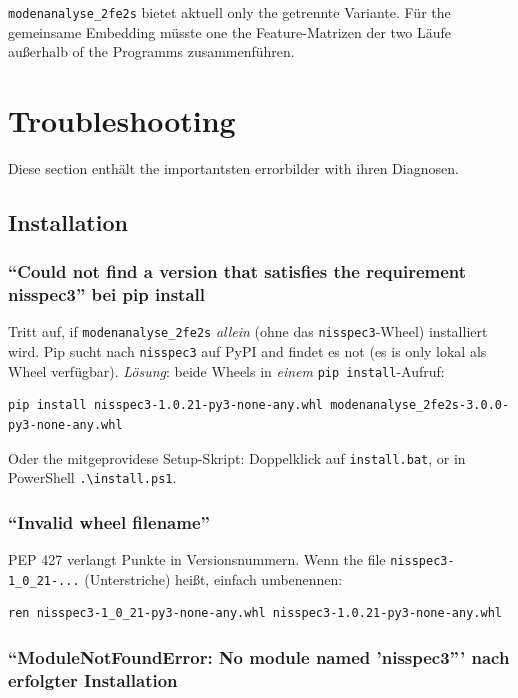 \documentclass[11pt,a4paper,twoside]{article}
\theoremstyle{remark}
\begin{document}
\texttt{modenanalyse\_2fe2s} bietet aktuell only the getrennte Variante.
F\"ur the gemeinsame Embedding m\"usste one the Feature-Matrizen
der two L\"aufe au\ss erhalb of the Programms zusammenf\"uhren.


\section{Troubleshooting}
\label{sec:fehlerbehebung}

Diese section enth\"alt the importantsten errorbilder with ihren
Diagnosen.

\subsection{Installation}

\subsubsection*{``Could not find a version that satisfies the requirement
nisspec3'' bei pip install}

Tritt auf, if \texttt{modenanalyse\_2fe2s} \emph{allein} (ohne das
\texttt{nisspec3}-Wheel) installiert wird. Pip sucht nach
\texttt{nisspec3} auf PyPI and findet es not (es is only lokal als
Wheel verf\"ugbar). \emph{L\"osung}: beide Wheels in \emph{einem}
\texttt{pip install}-Aufruf:

\begin{lstlisting}[style=bash]
pip install nisspec3-1.0.21-py3-none-any.whl modenanalyse_2fe2s-3.0.0-py3-none-any.whl
\end{lstlisting}

Oder the mitgeprovidese Setup-Skript: Doppelklick auf
\texttt{install.bat}, or in PowerShell \texttt{.\textbackslash install.ps1}.

\subsubsection*{``Invalid wheel filename''}

PEP 427 verlangt Punkte in Versionsnummern. Wenn the file
\texttt{nisspec3-1\_0\_21-...} (Unterstriche) hei\ss t, einfach
umbenennen:

\begin{lstlisting}[style=bash]
ren nisspec3-1_0_21-py3-none-any.whl nisspec3-1.0.21-py3-none-any.whl
\end{lstlisting}

\subsubsection*{``ModuleNotFoundError: No module named 'nisspec3''' nach
erfolgter Installation}
\end{document}
